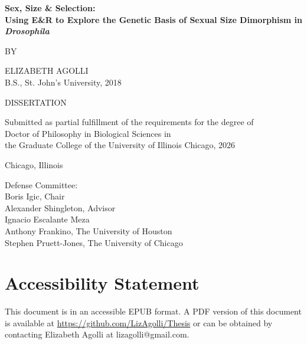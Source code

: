 \documentclass[12pt,reqno,oneside]{report}
\begin{document}
\thispagestyle{empty}
\begin{center}
\textbf{\Large
Sex, Size \& Selection:\\
Using E\&R to Explore the Genetic Basis of Sexual Size Dimorphism in \textit{Drosophila}
}

\vspace{2cm}

\normalsize
\singlespacing
BY

\vspace{0.5cm}

\Large
ELIZABETH AGOLLI\\
B.S., St. John's University, 2018

\vspace{2cm}
DISSERTATION

\vspace{1cm}
Submitted as partial fulfillment of the requirements for the degree of\\
Doctor of Philosophy in Biological Sciences in \\
the
Graduate College of the University of Illinois Chicago, 2026

\vspace{1cm}

Chicago, Illinois\\

\vfill
\raggedright
Defense Committee:\\
Boris Igic, Chair\\
Alexander Shingleton, Advisor\\
Ignacio Escalante Meza\\
Anthony Frankino, The University of Houston\\
Stephen Pruett-Jones, The University of Chicago\\
\end{center}

\frontmatter

\newpage
{}
\setcounter{page}{2}
\thispagestyle{plain}

\chapter*{Accessibility Statement}
\noindent
This document is in an accessible EPUB format. A PDF version of this document is available at \url{https://github.com/LizAgolli/Thesis} or can be obtained by contacting Elizabeth Agolli at lizagolli@gmail.com.
\end{document}
